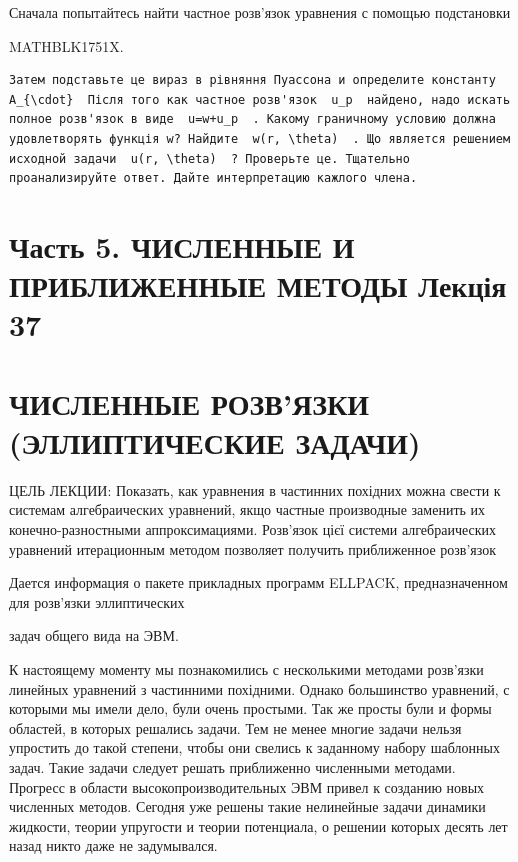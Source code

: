 \documentclass[
  ukrainian,
]{article}
\begin{document}
Сначала попытайтесь найти частное розв'язок уравнения с помощью
подстановки

MATHBLK1751X.

\begin{verbatim}
Затем подставьте це вираз в рівняння Пуассона и определите константу  A_{\cdot}  Після того как частное розв'язок  u_p  найдено, надо искать полное розв'язок в виде  u=w+u_p  . Какому граничному условию должна удовлетворять функція w? Найдите  w(r, \theta)  . Що является решением исходной задачи  u(r, \theta)  ? Проверьте це. Тщательно проанализируйте ответ. Дайте интерпретацию кажлого члена.
\end{verbatim}

\section{Часть 5. ЧИСЛЕННЫЕ И ПРИБЛИЖЕННЫЕ МЕТОДЫ Лекція
37}\label{ux447ux430ux441ux442ux44c-5.-ux447ux438ux441ux43bux435ux43dux43dux44bux435-ux438-ux43fux440ux438ux431ux43bux438ux436ux435ux43dux43dux44bux435-ux43cux435ux442ux43eux434ux44b-ux43bux435ux43aux446ux456ux44f-37}

\section{ЧИСЛЕННЫЕ РОЗВ'ЯЗКИ (ЭЛЛИПТИЧЕСКИЕ
ЗАДАЧИ)}\label{ux447ux438ux441ux43bux435ux43dux43dux44bux435-ux440ux43eux437ux432ux44fux437ux43aux438-ux44dux43bux43bux438ux43fux442ux438ux447ux435ux441ux43aux438ux435-ux437ux430ux434ux430ux447ux438}

ЦЕЛЬ ЛЕКЦИИ: Показать, как уравнения в частинних похідних можна свести к
системам алгебраических уравнений, якщо частные производные заменить их
конечно-разностными аппроксимациями. Розв'язок цієї системи
алгебраических уравнений итерационным методом позволяет получить
приближенное розв'язок

Дается информация о пакете прикладных программ ELLPACK, предназначенном
для розв'язки эллиптических

задач общего вида на ЭВМ.

К настоящему моменту мы познакомились с несколькими методами розв'язки
линейных уравнений з частинними похідними. Однако большинство уравнений,
с которыми мы имели дело, були очень простыми. Так же просты були и
формы областей, в которых решались задачи. Тем не менее многие задачи
нельзя упростить до такой степени, чтобы они свелись к заданному набору
шаблонных задач. Такие задачи следует решать приближенно численными
методами. Прогресс в области высокопроизводительных ЭВМ привел к
созданию новых численных методов. Сегодня уже решены такие нелинейные
задачи динамики жидкости, теории упругости и теории потенциала, о
решении которых десять лет назад никто даже не задумывался.
\end{document}
